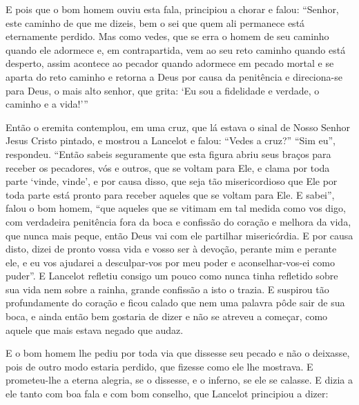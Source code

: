 E pois que o bom homem ouviu esta fala, principiou a chorar e falou: “Senhor,
este caminho de que me dizeis, bem o sei que quem ali permanece está
eternamente perdido. Mas como vedes, que se erra o homem de seu caminho quando
ele adormece e, em contrapartida, vem ao seu reto caminho quando está desperto,
assim acontece ao pecador quando adormece em pecado mortal e se aparta do reto
caminho e retorna a Deus por causa da penitência e direciona-se para Deus, o
mais alto senhor, que grita: ‘Eu sou a fidelidade e verdade, o caminho e a
vida!'” 

Então o eremita contemplou, em uma cruz, que lá estava o sinal de Nosso Senhor
Jesus Cristo pintado, e mostrou a Lancelot e falou: “Vedes a cruz?” “Sim eu”,
respondeu. “Então sabeis seguramente que esta figura abriu seus braços para
receber os pecadores, vós e outros, que se voltam para Ele, e clama por toda
parte ‘vinde, vinde’, e por causa disso, que seja tão misericordioso que Ele
por toda parte está pronto para receber aqueles que se voltam para Ele. E
sabei”, falou o bom homem, “que aqueles que se vitimam em tal medida como vos
digo, com verdadeira penitência fora da boca e confissão do coração e melhora
da vida, que nunca mais peque, então Deus vai com ele partilhar misericórdia. E
por causa disto, dizei de pronto vossa vida e vosso ser à devoção, perante mim
e perante ele, e eu vos ajudarei a desculpar-vos por meu poder e
aconselhar-vos-ei como puder”. E Lancelot refletiu consigo um pouco
como nunca tinha refletido sobre sua vida nem sobre a rainha, grande confissão
a isto o trazia. E suspirou tão profundamente do coração e ficou
calado que nem uma palavra pôde sair de sua boca, e ainda então bem gostaria de
dizer e não se atreveu a começar, como aquele que mais estava negado que audaz.


E o bom homem lhe pediu por toda via que dissesse seu pecado e não o deixasse,
pois de outro modo estaria perdido, que fizesse como ele lhe mostrava. E
prometeu-lhe a eterna alegria, se o dissesse, e o inferno, se ele se calasse. E
dizia a ele tanto com boa fala e com bom conselho, que Lancelot principiou a
dizer: 

